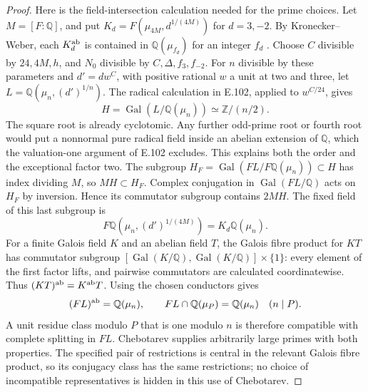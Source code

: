 \begin{proof}
Here is the field-intersection calculation needed for the prime choices.
Let \(M=[F:\mathbb Q]\), and put
\(K_d=F(\mu_{4M},d^{1/(4M)})\) for \(d=3,-2\).
By Kronecker--Weber, each \(K_d^{\rm ab}\) is contained in
\(\mathbb Q(\mu_{f_d})\) for an integer \(f_d\)
\citep[I, Theorem 4.16, pp.~49--50]{RootMilneCFT}.
Choose \(C\) divisible by \(24,4M,h\), and \(N_0\) divisible by
\(C,\Delta,f_3,f_{-2}\). For \(n\) divisible by these parameters and
\(d'=dw^C\), with positive rational \(w\) a unit at two and three,
let \(L=\mathbb Q(\mu_n,(d')^{1/n})\).
The radical calculation in E.102, applied to \(w^{C/24}\), gives
\[
 H=\operatorname{Gal}(L/\mathbb Q(\mu_n))\simeq\mathbb Z/(n/2).
\]
The square root is already cyclotomic. Any further odd-prime root or
fourth root would put a nonnormal pure radical field inside an abelian
extension of \(\mathbb Q\), which the valuation-one argument of E.102
excludes. This explains both the order and the exceptional factor two.
The subgroup
\(H_F=\operatorname{Gal}(FL/F\mathbb Q(\mu_n))\subset H\)
has index dividing \(M\), so \(MH\subset H_F\).
Complex conjugation in \(\operatorname{Gal}(FL/\mathbb Q)\) acts on
\(H_F\) by inversion. Hence its commutator subgroup contains \(2MH\).
The fixed field of this last subgroup is
\[
 F\mathbb Q(\mu_n,(d')^{1/(4M)})=K_d\mathbb Q(\mu_n).
\]
For a finite Galois field \(K\) and an abelian field \(T\), the Galois
fibre product for \(KT\) has commutator subgroup
\([\operatorname{Gal}(K/\mathbb Q),\operatorname{Gal}(K/\mathbb Q)]
\times\{1\}\): every element of the first factor lifts, and pairwise
commutators are calculated coordinatewise. Thus
\((KT)^{\rm ab}=K^{\rm ab}T\). Using the chosen conductors gives
\[
 (FL)^{\rm ab}=\mathbb Q(\mu_n),\qquad
 FL\cap\mathbb Q(\mu_P)=\mathbb Q(\mu_n)\quad(n\mid P).
\]
A unit residue class modulo \(P\) that is one modulo \(n\) is therefore
compatible with complete splitting in \(FL\). Chebotarev
\citep[Theorem 8.31, p.~147]{CohMilneANT} supplies arbitrarily large
primes with both properties. The specified pair of restrictions is
central in the relevant Galois fibre product, so its conjugacy class
has the same restrictions; no choice of incompatible representatives
is hidden in this use of Chebotarev.


\end{proof}
